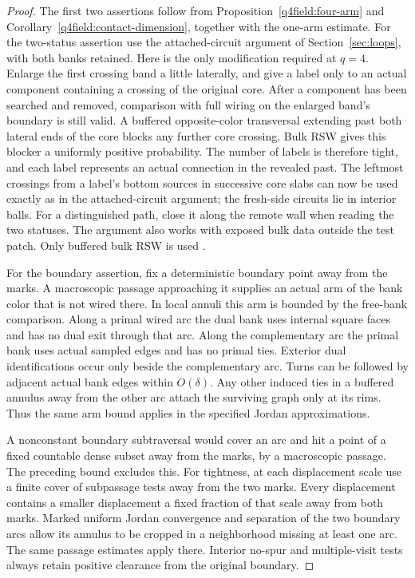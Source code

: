 \begin{proof}
The first two assertions follow from
Proposition~\ref{q4field:four-arm} and
Corollary~\ref{q4field:contact-dimension}, together with the one-arm
estimate.  For the two-status assertion use the attached-circuit
argument of Section~\ref{sec:loops}, with both banks retained.  Here
is the only modification required at $q=4$.  Enlarge the first
crossing band a little laterally, and give a label only to an actual
component containing a crossing of the original core.  After a
component has been searched and removed, comparison with full wiring
on the enlarged band's boundary is still valid.  A buffered
opposite-color transversal extending past both lateral ends of the
core blocks any further core crossing.  Bulk RSW gives this blocker
a uniformly positive probability.  The number of labels is therefore
tight, and each label represents an actual connection in the revealed
past.  The leftmost crossings from a label's bottom sources in
successive core slabs can now be used exactly as in the attached-circuit
argument; the fresh-side circuits lie in interior balls.  For a
distinguished path, close it along the remote wall when reading the
two statuses.  The argument also works with exposed bulk data outside
the test patch.  Only buffered bulk RSW is used
\citep{DCLM2019Isoradial}.

For the boundary assertion, fix a deterministic boundary point away
from the marks.  A macroscopic passage approaching it supplies an
actual arm of the bank color that is not wired there.  In local
annuli this arm is bounded by the free-bank comparison.  Along a
primal wired arc the dual bank uses internal square faces and has no
dual exit through that arc.  Along the complementary arc the primal
bank uses actual sampled edges and has no primal ties.  Exterior
dual identifications occur only beside the complementary arc.
Turns can be followed by adjacent actual bank edges within
$O(\delta)$.  Any other induced ties in a buffered annulus away from
the other arc attach the surviving graph only at its rims.  Thus the
same arm bound applies in the specified Jordan approximations.

A nonconstant boundary subtraversal would cover an arc and hit a
point of a fixed countable dense subset away from the marks, by a
macroscopic passage.  The preceding bound excludes this.  For
tightness, at each displacement scale use a finite cover of
subpassage tests away from the two marks.  Every displacement contains
a smaller displacement a fixed fraction of that scale away from
both marks.  Marked uniform Jordan convergence and separation of
the two boundary arcs allow its annulus to be cropped in a
neighborhood missing at least one arc.  The same passage estimates
apply there.  Interior no-spur and multiple-visit tests always retain
positive clearance from the original boundary.
\end{proof}


